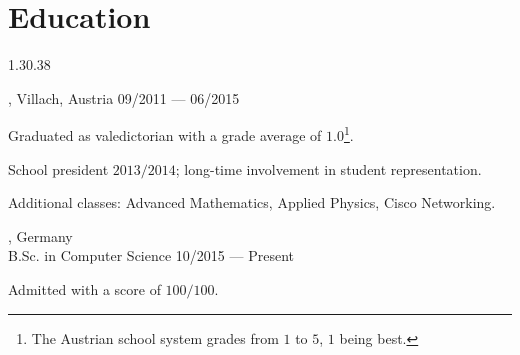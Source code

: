\section{Education}{1.3}{0.38}
\begin{entry}
	{, Villach, Austria}{}
	{09/2011 --- 06/2015}
	\item Graduated as valedictorian with a grade average of $1.0$\footnote{The Austrian school system grades from $1$ to $5$, $1$ being best.}.
	\item School president $2013/2014$; long-time involvement in student representation.
	\item Additional classes: Advanced Mathematics, Applied Physics, Cisco Networking.
\end{entry}
\begin{entry}
	{, Germany}
	{\\B.Sc. in Computer Science}
	{10/2015 --- Present}
	\item Admitted with a score of $100/100$.
\end{entry}


